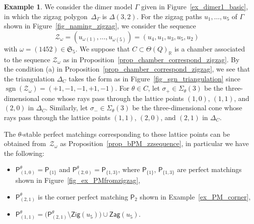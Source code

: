 \documentclass[pdftex]{sigma}
\numberwithin{equation}{section}
\theoremstyle{definition}
\newtheorem{Example}[Theorem]{Example}
\newcommand{\RR}{\mathbb{R}}
\newcommand{\calZ}{\mathcal{Z}}
\newcommand{\fkS}{\mathfrak{S}}
\newcommand{\sfP}{\mathsf{P}}
\newcommand{\sgn}{\operatorname{sgn}}
\newcommand{\Zig}{\mathsf{Zig}}
\newcommand{\Zag}{\mathsf{Zag}}
\newcommand{\permII}{\omega}
\begin{document}
\begin{Example}
We consider the dimer model $\Gamma$ given in Figure~\ref{ex_dimer1_basic}, in which the zigzag polygon~$\Delta_\Gamma$ is $\Delta(3,2)$.
For the zigzag paths $u_1, \dots, u_5$ of $\Gamma$ shown in Figure~\ref{fig_naming_zigzag},
we consider the sequence
\[
\calZ_\permII=(u_{\permII(1)}, \dots, u_{\permII(5)})=(u_4,u_1,u_3,u_5,u_2)
\]
with $\permII=(1452)\in\fkS_5$. We suppose that $C\subset\Theta(Q)_\RR$ is a chamber associated to the sequence $\calZ_\permII$ as in Proposition~\ref{prop_chamber_correspond_zigzag}.
By the condition (a) in Proposition~\ref{prop_chamber_correspond_zigzag},
we see that the triangulation $\Delta_C$ takes the form as in Figure~\ref{fig_sgn_triangulation} since $\sgn(\calZ_\permII)=(+1,-1,-1,+1,-1)$.
For $\theta\in C$, let $\sigma_+\in\Sigma_\theta(3)$ be the three-dimensional cone
whose rays pass through the lattice points $(1,0)$, $(1,1)$, and $(2,0)$ in $\Delta_C$.
Similarly, let $\sigma_-\in\Sigma_\theta(3)$ be the three-dimensional cone
whose rays pass through the lattice points $(1,1)$, $(2,0)$, and $(2,1)$ in $\Delta_C$.

\begin{center}
{}
\end{center}

The $\theta$-stable perfect matchings corresponding to these lattice points can be obtained from~$\calZ_\permII$ as Proposition~\ref{prop_bPM_zzsequence}, in particular we have the following:
\begin{itemize}\itemsep=0pt
\item $\sfP^\theta_{(1,0)}=\sfP_{\{1\}}$ and $\sfP^\theta_{(2,0)}=\sfP_{\{1,3\}}$, where $\sfP_{\{1\}}$, $\sfP_{\{1,3\}}$ are perfect matchings shown in Fig\-ure~\ref{fig_ex_PMfromzigzag},
\item $\sfP^\theta_{(2,1)}$ is the corner perfect matching $\sfP_2$ shown in Example~\ref{ex_PM_corner},
\item $\sfP^\theta_{(1,1)}=\big(\sfP^\theta_{(2,1)}{\setminus}\Zig(u_5)\big)\cup\Zag(u_5)$.
\end{itemize}


\end{Example}
\end{document}
